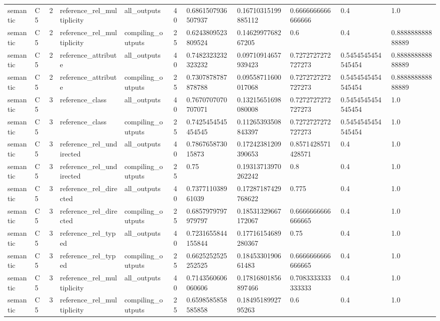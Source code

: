\begin{tabular}{lllllllllll}
semantic & C5 & 2 & reference\_rel\_multiplicity & all\_outputs & 40 & 0.6861507936507937 & 0.16710315199885112 & 0.6666666666666666 & 0.4 & 1.0 \\
semantic & C5 & 2 & reference\_rel\_multiplicity & compiling\_outputs & 25 & 0.6243809523809524 & 0.1462997768267205 & 0.6 & 0.4 & 0.888888888888889 \\
semantic & C5 & 2 & reference\_attribute & all\_outputs & 40 & 0.7482323232323232 & 0.09710914657939423 & 0.7272727272727273 & 0.5454545454545454 & 0.888888888888889 \\
semantic & C5 & 2 & reference\_attribute & compiling\_outputs & 25 & 0.7307878787878788 & 0.09558711600017068 & 0.7272727272727273 & 0.5454545454545454 & 0.888888888888889 \\
semantic & C5 & 3 & reference\_class & all\_outputs & 40 & 0.7670707070707071 & 0.13215651698080008 & 0.7272727272727273 & 0.5454545454545454 & 1.0 \\
semantic & C5 & 3 & reference\_class & compiling\_outputs & 25 & 0.7425454545454545 & 0.11265393508843397 & 0.7272727272727273 & 0.5454545454545454 & 1.0 \\
semantic & C5 & 3 & reference\_rel\_undirected & all\_outputs & 40 & 0.786765873015873 & 0.17242381209390653 & 0.8571428571428571 & 0.4 & 1.0 \\
semantic & C5 & 3 & reference\_rel\_undirected & compiling\_outputs & 25 & 0.75 & 0.19313713970262242 & 0.8 & 0.4 & 1.0 \\
semantic & C5 & 3 & reference\_rel\_directed & all\_outputs & 40 & 0.737711038961039 & 0.17287187429768622 & 0.775 & 0.4 & 1.0 \\
semantic & C5 & 3 & reference\_rel\_directed & compiling\_outputs & 25 & 0.6857979797979797 & 0.18531329667172067 & 0.6666666666666665 & 0.4 & 1.0 \\
semantic & C5 & 3 & reference\_rel\_typed & all\_outputs & 40 & 0.7231655844155844 & 0.17716154689280367 & 0.75 & 0.4 & 1.0 \\
semantic & C5 & 3 & reference\_rel\_typed & compiling\_outputs & 25 & 0.6625252525252525 & 0.1845330190661483 & 0.6666666666666665 & 0.4 & 1.0 \\
semantic & C5 & 3 & reference\_rel\_multiplicity & all\_outputs & 40 & 0.7143560606060606 & 0.17816801856897466 & 0.7083333333333333 & 0.4 & 1.0 \\
semantic & C5 & 3 & reference\_rel\_multiplicity & compiling\_outputs & 25 & 0.6598585858585858 & 0.1849518992795263 & 0.6 & 0.4 & 1.0 \\

\end{tabular}
